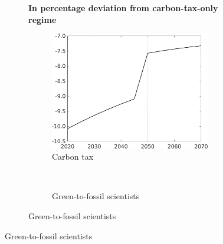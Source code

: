 \begin{figure}[h!!]
\begin{subfigure}[]{1\textwidth}
\begin{subfigure}[]{0.4\textwidth}
\end{subfigure}	 
 	\end{subfigure}		
		
	\vspace{3mm}
	 	\begin{subfigure}[]{1\textwidth}
		\centering\footnotesize{\textbf{In percentage deviation from carbon-tax-only regime}}\\ \vspace{2mm}
\begin{subfigure}[]{0.4\textwidth}
	\caption{Carbon tax}
	\includegraphics[width=1\textwidth]{../../codding_model/own_basedOnFried/optimalPol_010922_revision/figures/all_13Sept22/CompTaufPER_bytaul_Reg5_Tauf_spillover0_nsk0_xgr0_knspil0_sep0_LFlimit1_emsbase0_countec0_GovRev0_etaa0.79_lgd0.png} 
\end{subfigure}
\begin{minipage}[]{0.1\textwidth}
\
\end{minipage}
\begin{subfigure}[]{0.4\textwidth}
\caption{Green-to-fossil scientists}

\end{subfigure}
\end{subfigure}
\end{figure}
